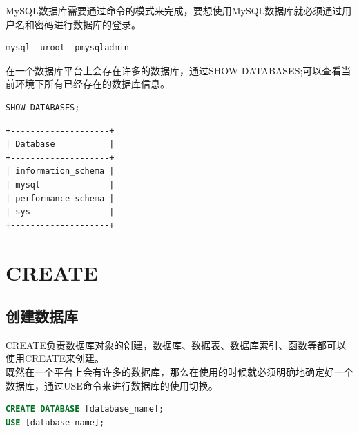 \documentclass[12pt, openany, oneside]{book}
\begin{document}
MySQL数据库需要通过命令的模式来完成，要想使用MySQL数据库就必须通过用户名和密码进行数据库的登录。\\


\begin{lstlisting}[language=SQL]
mysql -uroot -pmysqladmin
\end{lstlisting}

在一个数据库平台上会存在许多的数据库，通过SHOW DATABASES;可以查看当前环境下所有已经存在的数据库信息。\\


\begin{lstlisting}[language=SQL]
SHOW DATABASES;
\end{lstlisting}

\begin{tcolorbox}
\begin{verbatim}
+--------------------+
| Database           |
+--------------------+
| information_schema |
| mysql              |
| performance_schema |
| sys                |
+--------------------+
	\end{verbatim}
\end{tcolorbox}

\newpage

\chapter{CREATE}

\section{创建数据库}

CREATE负责数据库对象的创建，数据库、数据表、数据库索引、函数等都可以使用CREATE来创建。\\

既然在一个平台上会有许多的数据库，那么在使用的时候就必须明确地确定好一个数据库，通过USE命令来进行数据库的使用切换。

\vspace{-0.5cm}

\begin{lstlisting}[language=SQL]
CREATE DATABASE [database_name];
USE [database_name];
\end{lstlisting}

\vspace{0.5cm}

\end{document}
